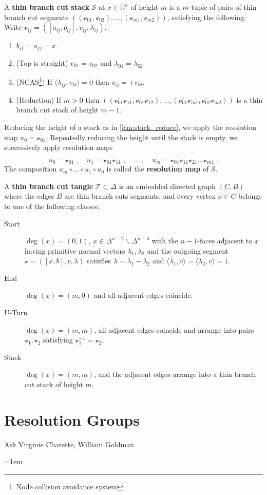 \documentclass[12pt,a4paper,abstract=true,draft]{scrartcl}
\begin{document}
\begin{definition}
  \label{def:stack}
  A \textbf{thin branch cut stack} $𝒮$ at $x ∈ ℝ^n$ of height $m$ is a $m$-tuple of pairs of thin branch cut segments $((𝓋_{01},𝓋_{02}),…,(𝓋_{m1},𝓋_{m2}))$, satisfying the following:
  Write $𝓋_{ij} = ([a_{ij},b_{ij}],v_{ij},λ_{ij})$.
  \begin{enumerate}
    \item $b_{i1} = a_{i2} = x$.
    \item (Top is straight) $v_{01} = v_{02}$ and $λ_{01} = λ_{02}$.
    \item (NCAS\footnote{Node collision avoidance system}) If $⟨λ_{ij},v_{kl} ⟩ = 0$ then $v_{ij}= ± v_{kl}$.
    \item (Reduction) If $m>0$ then $((\overline{𝓋_{01}} 𝓋_{11}, \overline{𝓋_{01}} 𝓋_{12}), …, (\overline{𝓋_{01}} 𝓋_{m1}, \overline{𝓋_{01}} 𝓋_{m2}))$ is a thin branch cut stack of height $m-1$.\label{itm:stack_reduce}
  \end{enumerate}

  Reducing the height of a stack as in \cref{itm:stack_reduce}, we apply the resolution map $u_0 = \overline{𝓋_{01}}$.
  Repeatedly reducing the height until the stack is empty, we successively apply resolution maps
  \[
    u_0 = \overline{𝓋_{01}}\;, \quad
    u_1 = \overline{\overline{𝓋_{01}} 𝓋_{11}}\;, \quad
    …\;, \quad
    u_m = \overline{\overline{\overline{\overline{ 𝓋_{01}} 𝓋_{11}} 𝓋_{21}} … 𝓋_{m1}} \;.
  \]
  The composition $u_m ∘ … ∘ u_1 ∘ u_0$ is called the \textbf{resolution map} of $𝒮$.
\end{definition}

\begin{definition}
  \label{def:bct}
  A \textbf{thin branch cut tangle} $𝒯 ⊂ Δ$ is an embedded directed graph $(C,B)$ where the edges $B$ are thin branch cuts segments, and every vertex $x ∈ C$ belongs to one of the following classes:
  \begin{description}
    \item[Start] $\deg(x) = (0,1)$, $x ∈ Δ^{n-2} ∖ Δ^{n-3}$ with the $n-1$-faces adjacent to $x$ having primitive normal vectors $λ_1,λ_2$ and the outgoing segment $𝓋 = ([x,b],v,λ)$ satisfies $λ = λ_1-λ_2$ and $⟨λ_1,v ⟩ = ⟨ λ_2,v ⟩ = 1$.
    \item[End] $\deg(x) = (m,0)$ and all adjacent edges coincide.
    \item[U-Turn] $\deg(x) = (m,m)$, all adjacent edges coincide and arrange into pairs $𝓋_1, 𝓋_2$ satisfying $𝓋_1^{-1} = 𝓋_2$.
    \item[Stack] $\deg(x) = (m,m)$, and the adjacent edges arrange into a thin branch cut stack of height $m$.
  \end{description}
\end{definition}


\section{Resolution Groups}

Ask Virginie Charette, William Goldman

\emergencystretch=1em
\printbibliography
\end{document}
